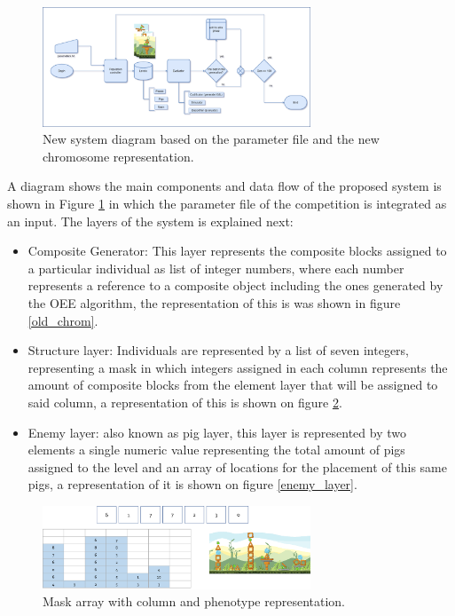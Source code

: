 \documentclass[conference]{IEEEtran}
\begin{document}
    \begin{figure}[htbp]
    \centerline{\includegraphics[width=80mm]{Images/new_model_v2.png}}
    \caption{New system diagram based on the parameter file and the new chromosome representation.}
    \label{new_model}
    \end{figure}
    
    A diagram shows the main components and data flow of the proposed system
    is shown in Figure \ref{new_model} in which the parameter file of the competition 
    is integrated as an input. The layers of the system is explained next:
    
    \begin{itemize}
        \item Composite Generator:  This layer represents the composite blocks
        assigned to a particular individual as list of integer numbers, where
        each number represents a reference to a composite object including the
        ones generated by the OEE algorithm, the representation of this is was
        shown in figure \ref{old_chrom}.
        \item Structure layer: Individuals are represented by a list of seven
        integers, representing a mask in which integers assigned in each column
        represents the amount of composite blocks from the element layer that
        will be assigned to said column, a representation of this is shown on
        figure \ref{mask_layer}.
        \item Enemy layer: also known as pig layer, this layer is represented by
        two elements a single numeric value representing the total amount of
        pigs assigned to the level and an array of locations for the placement
        of this same pigs, a representation of it is shown on figure
        \ref{enemy_layer}. 
    \end{itemize}
    
    \begin{figure}[htbp]
        \centerline{\includegraphics[width=80mm]{Images/mask_layer.png}}
        \caption{Mask array with column and phenotype representation.}
        \label{mask_layer}
    \end{figure}
    
\end{document}
